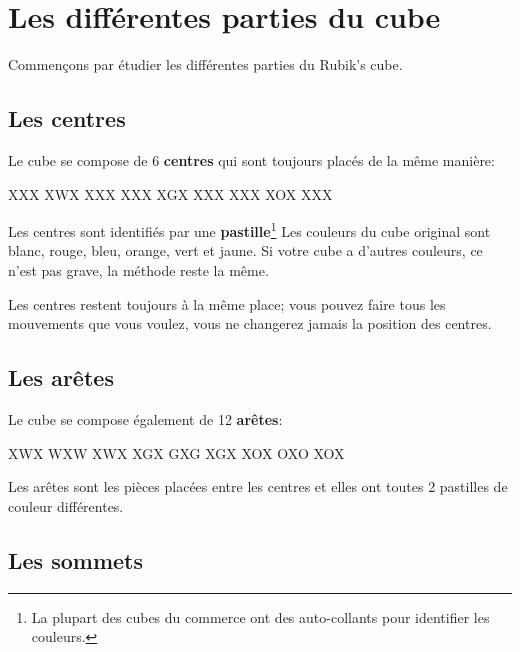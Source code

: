 \chapter{Les différentes parties du cube}

Commençons par étudier les différentes parties du Rubik's cube.

\section{Les centres}

Le cube se compose de 6 \textbf{centres} qui sont toujours placés de la même manière:

\begin{center}
	\RubikFaceUp%
	{X}{X}{X}%
	{X}{W}{X}%
	{X}{X}{X}
	\RubikFaceRight%
	{X}{X}{X}%
	{X}{G}{X}%
	{X}{X}{X}
	\RubikFaceFront%
	{X}{X}{X}%
	{X}{O}{X}%
	{X}{X}{X}
\end{center}

Les centres sont identifiés par une \textbf{pastille}\footnote{La plupart des cubes du commerce ont des auto-collants pour identifier les couleurs.} Les
couleurs du cube original sont blanc, rouge, bleu, orange, vert et jaune.
Si votre cube a d'autres couleurs, ce n'est pas grave, la méthode reste la
même.

Les centres restent toujours à la même place; vous pouvez faire tous les mouvements que vous voulez, vous ne changerez jamais la position des centres.

\section{Les arêtes}
\begin{samepage}
Le cube se compose également de 12 \textbf{arêtes}:

\begin{center}
	\RubikFaceUp%
	{X}{W}{X}%
	{W}{X}{W}%
	{X}{W}{X}
	\RubikFaceRight%
	{X}{G}{X}%
	{G}{X}{G}%
	{X}{G}{X}
	\RubikFaceFront%
	{X}{O}{X}%
	{O}{X}{O}%
	{X}{O}{X}
\end{center}
\end{samepage}

Les arêtes sont les pièces placées entre les centres et elles ont toutes 2 pastilles de couleur différentes.

\section{Les sommets}

